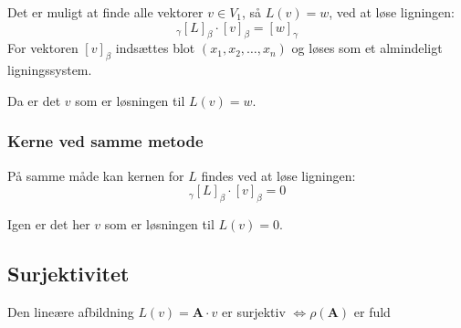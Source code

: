 Det er muligt at finde alle vektorer \(v \in V_1\), så \(L(v) = w\), ved at løse ligningen:
\[
_\gamma [L]_\beta \cdot [v]_\beta = [w]_\gamma
\]
For vektoren \([v]_\beta\) indsættes blot \((x_1, x_2, \ldots, x_n)\) og løses som et almindeligt ligningssystem.

Da er det $v$ som er løsningen til $L(v) = w$.

\subsubsection{Kerne ved samme metode}
På samme måde kan kernen for $L$ findes ved at løse ligningen:
\[
_\gamma [L]_\beta \cdot [v]_\beta = 0
\]

Igen er det her $v$ som er løsningen til $L(v) = 0$.

\subsection{Surjektivitet}

Den lineære afbildning $L(v) = \mathbf{A} \cdot v$ er surjektiv $\iff \rho(\mathbf{A})$ er fuld 